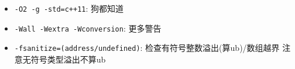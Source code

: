 \begin{itemize}
	\item \texttt{-O2 -g -std=c++11}: 狗都知道
	\item \texttt{-Wall -Wextra -Wconversion}: 更多警告
	\item \texttt{-fsanitize=(address/undefined)}: 检查有符号整数溢出(算ub)/数组越界
		\subitem 注意无符号类型溢出不算ub
\end{itemize}